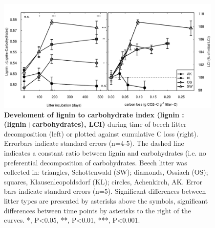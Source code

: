 \documentclass[10pt]{article}
\begin{document}
\begin{flushleft}
\newpage
\begin{figure}[!ht]
\begin{center}
\includegraphics{ligpaper-lci}
\end{center}
\caption{
{\bf Develoment of lignin to carbohydrate index (lignin : (lignin+carbohydrates), LCI)} during time of beech litter decomposition (left) or plotted against cumulative C loss (right). Errorbars indicate standard errors (n=4-5). The dashed line indicates a constant ratio between lignin and carbohydrates (i.e. no preferential decomposition of carbohydrates. Beech litter was collected in: triangles, Schottenwald (SW); diamonds, Ossiach (OS); squares, Klausenleopoldsdorf (KL); circles, Achenkirch, AK. Error bars indicate standard errors (n=5). Significant differences between litter types are presented by asterisks above the symbols, significant differences between time points by asterisks to the right of the curves. *, P\textless 0.05, **, P\textless 0.01, ***, P\textless 0.001.}
\end{figure}



\end{flushleft}
\end{document}
